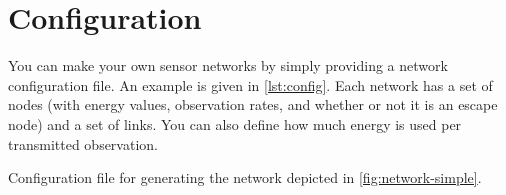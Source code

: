 \documentclass[headings=optiontoheadandtoc,listof=totoc,parskip=full]{scrartcl}
\newenvironment{longlisting}{\captionsetup{type=listing}}{}
\begin{document}
\section{Configuration}
\label{sec:config}

You can make your own sensor networks by simply providing a network configuration file. An example is given in \cref{lst:config}. Each network has a set of nodes (with energy values, observation rates, and whether or not it is an escape node) and a set of links. You can also define how much energy is used per transmitted observation.

\begin{longlisting}
    \caption{Configuration file for generating the network depicted in \cref{fig:network-simple}.}
    \label{lst:config}
\end{longlisting}
\end{document}

